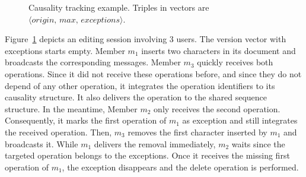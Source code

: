 \begin{figure}
  \centering
  
  \caption{\label{fig:timeline} Causality tracking example. Triples in vectors
    are $\langle origin,\,max,\, exceptions \rangle$.}
\end{figure}

Figure~\ref{fig:timeline} depicts an editing session involving 3 users. The
version vector with exceptions starts empty. Member $m_1$ inserts two characters
in its document and broadcasts the corresponding messages. Member $m_3$ quickly
receives both operations. Since it did not receive these operations before, and
since they do not depend of any other operation, it integrates the operation
identifiers to its causality structure. It also delivers the operation to the
shared sequence structure. In the meantime, Member $m_2$ only receives the
second operation. Consequently, it marks the first operation of $m_1$ as
exception and still integrates the received operation. Then, $m_3$ removes the
first character inserted by $m_1$ and broadcasts it. While $m_1$ delivers the
removal immediately, $m_2$ waits since the targeted operation belongs to the
exceptions. Once it receives the missing first operation of $m_1$, the exception
disappears and the delete operation is performed.





